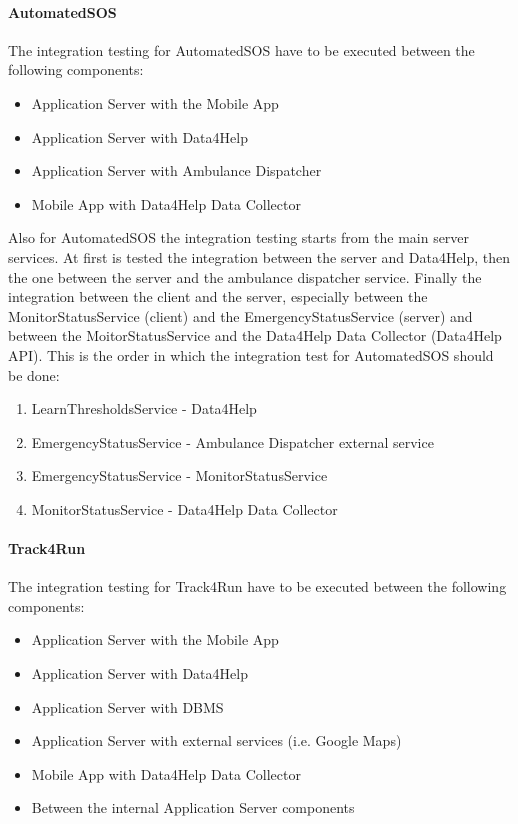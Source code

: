 \documentclass[a4paper]{article}
\begin{document}
\paragraph{AutomatedSOS}
The integration testing for AutomatedSOS have to be executed between the following components:
\begin{itemize}
    \item Application Server with the Mobile App
    \item Application Server with Data4Help
    \item Application Server with Ambulance Dispatcher
    \item Mobile App with Data4Help Data Collector
\end{itemize}

\noindent Also for AutomatedSOS the integration testing starts from the main server services. At first is tested the integration between the server and Data4Help, then the one between the server and the ambulance dispatcher service.
Finally the integration between the client and the server, especially between the MonitorStatusService (client) and the EmergencyStatusService (server) and between the MoitorStatusService and the Data4Help Data Collector (Data4Help API).
\newline\newline This is the order in which the integration test for AutomatedSOS should be done:

\begin{enumerate}[label*=\bf{\arabic*} . ]
    \item LearnThresholdsService - Data4Help
    \item EmergencyStatusService - Ambulance Dispatcher external service
    \item EmergencyStatusService - MonitorStatusService
    \item MonitorStatusService - Data4Help Data Collector
\end{enumerate}

\paragraph{Track4Run}
The integration testing for Track4Run have to be executed between the following components:

\begin{itemize}
    \item Application Server with the Mobile App
    \item Application Server with Data4Help
    \item Application Server with DBMS
    \item Application Server with external services (i.e. Google Maps)
    \item Mobile App with Data4Help Data Collector
    \item Between the internal Application Server components
\end{itemize}
\end{document}
